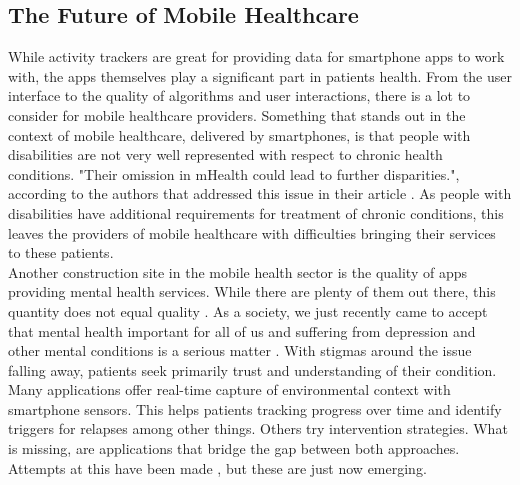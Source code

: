 \subsection{The Future of Mobile Healthcare}
While activity trackers are great for providing data for smartphone apps to work with, the apps themselves play a significant part in patients health. From the user interface to the quality of algorithms and user interactions, there is a lot to consider for mobile healthcare providers. Something that stands out in the context of mobile healthcare, delivered by smartphones, is that people with disabilities are not very well represented with respect to chronic health conditions. "Their omission in mHealth could lead to further disparities.", according to the authors that addressed this issue in their article \cite{jones2018mobile}. As people with disabilities have additional requirements for treatment of chronic conditions, this leaves the providers of mobile healthcare with difficulties bringing their services to these patients. \\
Another construction site in the mobile health sector is the quality of apps providing mental health services. While there are plenty of them out there, this quantity does not equal quality \cite{torous2017needed}. As a society, we just recently came to accept that mental health important for all of us and suffering from depression and other mental conditions is a serious matter \cite{bharadwaj2017mental}. With stigmas around the issue falling away, patients seek primarily trust and understanding of their condition. Many applications offer real-time capture of environmental context with smartphone sensors. This helps patients tracking progress over time and identify triggers for relapses among other things. Others try intervention strategies. What is missing, are applications that bridge the gap between both approaches. Attempts at this have been made \cite{torous2019creating}, but these are just now emerging.
